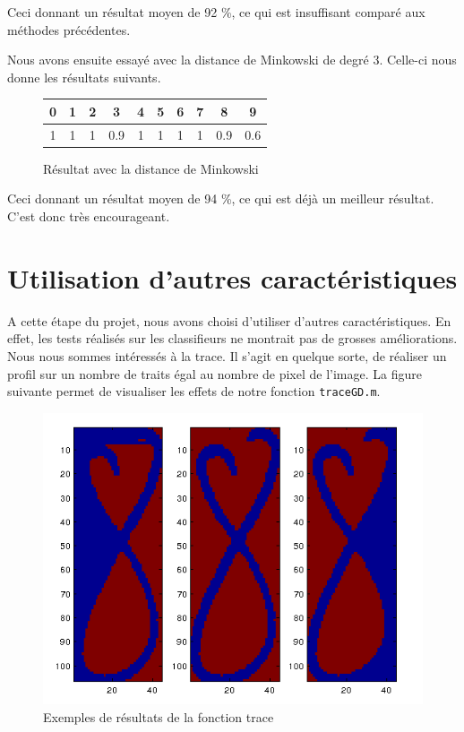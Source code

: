 Ceci donnant un résultat moyen de 92 \%, ce qui est insuffisant
comparé aux méthodes précédentes.

Nous avons ensuite essayé avec la distance de Minkowski de degré 3.
Celle-ci nous donne les résultats suivants.

\begin{figure}[h!]
\centering
\begin{tabular}{|*{10}{c|}}
    \hline
    0 & 1 & 2 & 3 & 4 & 5 & 6 & 7 & 8 & 9 \\
    \hline
    1 & 1 & 1 & 0.9 & 1 & 1 & 1 & 1 & 0.9 & 0.6  \\
    \hline
\end{tabular}
\caption{Résultat avec la distance de Minkowski}
\end{figure} 

Ceci donnant un résultat moyen de 94 \%, ce qui est déjà un meilleur
résultat. C'est donc très encourageant.

\section{Utilisation d'autres caractéristiques}

A cette étape du projet, nous avons choisi d'utiliser d'autres     
caractéristiques. En effet, les tests réalisés sur les classifieurs
ne montrait pas de grosses améliorations. \\
Nous nous sommes intéressés à la trace. Il s'agit en quelque sorte, 
de réaliser un profil sur un nombre de traits égal au nombre de pixel de
l'image. La figure suivante permet de visualiser les effets de notre
fonction \texttt{traceGD.m}.

\begin{figure}[h!]
\centering
\includegraphics[scale=0.5]{trace.png}
\caption{Exemples de résultats de la fonction trace}
\end{figure}

